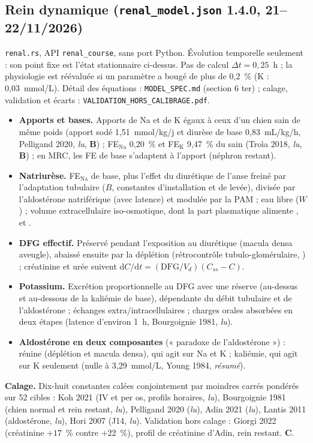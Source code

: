 \documentclass[10pt,a4paper]{article}
\newcommand{\cmd}[1]{\texttt{#1}}
\newcommand{\vp}[1]{\text{\texttt{\detokenize{#1}}}}
\newcommand{\evB}{\textcolor{green!45!black}{\textbf{B}}}
\newcommand{\evC}{\textcolor{orange!80!black}{\textbf{C}}}
\newcommand{\acc}[1]{\textsl{#1}}
\newcommand{\dd}{\mathrm{d}}
\begin{document}
\subsection{Rein dynamique (\cmd{renal\_model.json} 1.4.0, 21--22/11/2026)}\label{sec:reindyn}
\cmd{renal.rs}, API \cmd{renal\_course}, sans port Python. Évolution temporelle seulement : son point fixe est l'état stationnaire ci-dessus. Pas de calcul $\Delta t = 0{,}25$~h ; la physiologie est réévaluée si un paramètre a bougé de plus de 0,2~\% (K : 0,03~mmol/L). Détail des équations : \cmd{MODEL\_SPEC.md} (section 6 ter) ; calage, validation et écarts : \cmd{VALIDATION\_HORS\_CALIBRAGE.pdf}.
\begin{itemize}
\item \textbf{Apports et bases.} Apports de Na et de K égaux à ceux d'un chien sain de même poids (apport sodé 1,51~mmol/kg/j et diurèse de base 0,83~mL/kg/h, Pelligand 2020, \acc{lu}, \evB{}) ; FE$_\text{Na}$ 0,20~\% et FE$_\text{K}$ 9,47~\% du sain (Troìa 2018, \acc{lu}, \evB{}) ; en MRC, les FE de base s'adaptent à l'apport (néphron restant).
\item \textbf{Natriurèse.} FE$_\text{Na}$ de base, plus l'effet du diurétique de l'anse freiné par l'adaptation tubulaire ($B$, constantes d'installation et de levée), divisée par l'aldostérone natriférique (avec latence) et modulée par la PAM ; eau libre ($W$) ; volume extracellulaire iso-osmotique, dont la part plasmatique alimente \vp{vol_shift}, \vp{hb} et \vp{alb}.
\item \textbf{DFG effectif.} Préservé pendant l'exposition au diurétique (macula densa aveugle), abaissé ensuite par la déplétion (rétrocontrôle tubulo-glomérulaire, \vp{gfr_g_vol}) ; créatinine et urée suivent $\dd C/\dd t = (\text{DFG}/V_d)(C_{ss} - C)$.
\item \textbf{Potassium.} Excrétion proportionnelle au DFG avec une réserve (au-dessus et au-dessous de la kaliémie de base), dépendante du débit tubulaire et de l'aldostérone ; échanges extra/intracellulaires ; charges orales absorbées en deux étapes (latence d'environ 1~h, Bourgoignie 1981, \acc{lu}).
\item \textbf{Aldostérone en deux composantes} (« paradoxe de l'aldostérone ») : rénine (déplétion et macula densa), qui agit sur Na et K ; kaliémie, qui agit sur K seulement (nulle à 3,29~mmol/L, Young 1984, \acc{résumé}).
\end{itemize}
\textbf{Calage.} Dix-huit constantes calées conjointement par moindres carrés pondérés sur 52 cibles : Koh 2021 (IV et per os, profils horaires, \acc{lu}), Bourgoignie 1981 (chien normal et rein restant, \acc{lu}), Pelligand 2020 (\acc{lu}), Adin 2021 (\acc{lu}), Lantis 2011 (aldostérone, \acc{lu}), Hori 2007 (J14, \acc{lu}). Validation hors calage : Giorgi 2022 (créatinine $+17$~\% contre $+22$~\%), profil de créatinine d'Adin, rein restant. \evC{}.
\end{document}
